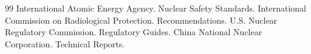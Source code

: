 \documentclass[12pt,UTF8]{ctexbook}
\begin{document}
\begin{thebibliography}{99}
 International Atomic Energy Agency. Nuclear Safety Standards.
 International Commission on Radiological Protection. Recommendations.
 U.S. Nuclear Regulatory Commission. Regulatory Guides.
 China National Nuclear Corporation. Technical Reports.
\end{thebibliography}
\end{document}
